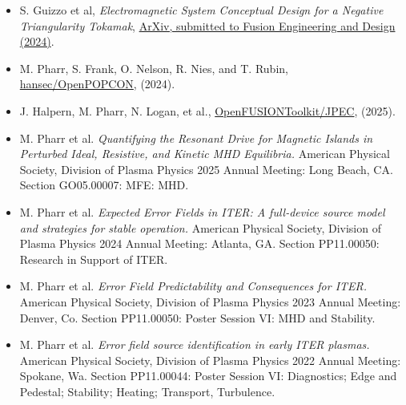 \documentclass[margin]{rpires}
\begin{document}
\begin{resume}
\begin{itemize}
    \item {S. Guizzo et al, \textit{Electromagnetic System Conceptual Design for a Negative Triangularity Tokamak}, \href{ https://doi.org/10.48550/arXiv.2501.14682}{ArXiv, submitted to Fusion Engineering and Design (2024)}.}
    \item {M. Pharr, S. Frank, O. Nelson, R. Nies, and T. Rubin, \href{https://github.com/hansec/OpenPOPCON}{hansec/OpenPOPCON}, (2024). }
    \item {J. Halpern, M. Pharr, N. Logan, et al., \href{https://github.com/OpenFUSIONToolkit/JPEC}{OpenFUSIONToolkit/JPEC}, (2025). }
    \vspace{0.5cm}
    \item M. Pharr et al. \textit{Quantifying the Resonant Drive for Magnetic Islands in Perturbed Ideal, Resistive, and Kinetic MHD Equilibria.} American Physical Society, Division of Plasma Physics 2025 Annual Meeting: Long Beach, CA. Section GO05.00007: MFE: MHD.
    \item M. Pharr et al. \textit{Expected Error Fields in ITER: A full-device source model and strategies for stable operation.} American Physical Society, Division of Plasma Physics 2024 Annual Meeting: Atlanta, GA. Section PP11.00050: Research in Support of ITER.
    \item M. Pharr et al. \textit{Error Field Predictability and Consequences for ITER.} American Physical Society, Division of Plasma Physics 2023 Annual Meeting: Denver, Co. Section PP11.00050: Poster Session VI: MHD and Stability.
    \item M. Pharr et al. \textit{Error field source identification in early ITER plasmas.} American Physical Society, Division of Plasma Physics 2022 Annual Meeting: Spokane, Wa. Section PP11.00044: Poster Session VI: Diagnostics; Edge and Pedestal; Stability; Heating; Transport, Turbulence.
    \end{itemize}


\end{resume}
\end{document}
